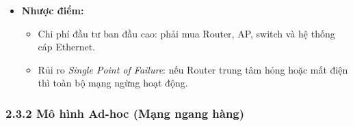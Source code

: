 \begin{itemize}
    \item \textbf{Nhược điểm\cite{geeksforgeeks2023}:}
    \begin{itemize}
        \item Chi phí đầu tư ban đầu cao: phải mua Router, AP, switch 
        và hệ thống cáp Ethernet.
        \item Rủi ro \textit{Single Point of Failure}: nếu Router trung tâm 
        hỏng hoặc mất điện thì toàn bộ mạng ngừng hoạt động.
    \end{itemize}
\end{itemize}


\subsubsection{2.3.2 Mô hình Ad-hoc (Mạng ngang hàng)\cite{kurose2017}}

